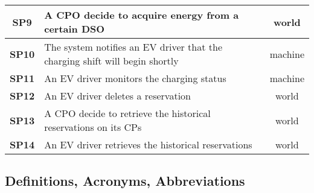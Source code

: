 \begin{table}[H]
\begin{tabularx}{\textwidth}{c|X|c}
        \textbf{SP9}  & A CPO decide to acquire energy from a certain DSO                                                                                                                     & world         \\ \midrule
        \textbf{SP10} & The system notifies an EV driver that the charging shift will begin shortly                                                                                           & machine       \\ \midrule
        \textbf{SP11} & An EV driver monitors the charging status                                                                                                                             & machine       \\ \midrule
        \textbf{SP12} & An EV driver deletes a reservation                                                                                                                                    & world         \\ \midrule
        \textbf{SP13} & A CPO decide to retrieve the historical reservations on its CPs                                                                                                       & world         \\ \midrule
        \textbf{SP14} & An EV driver retrieves the historical reservations                                                                                                                    & world         \\ \bottomrule
    \end{tabularx}
\end{table}

\subsection{Definitions, Acronyms, Abbreviations}

